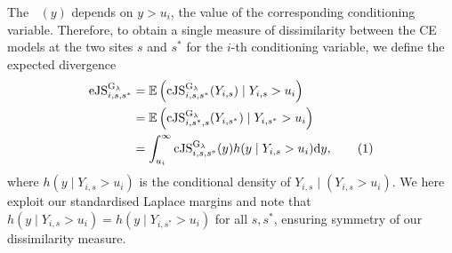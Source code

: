 \documentclass[12pt,compact]{article}
\newcommand{\JSGa}{\mathop{\mathrm{JS}^{\mathrm{G}_{\lambda}}}\nolimits}
\newcommand{\cJSGa}[1]{\mathop{\mathrm{cJS}_{i, #1}^{\mathrm{G}_{\lambda}}}\nolimits}
\newcommand{\eJSGa}[1]{\mathop{\mathrm{eJS}_{i, #1}^{\mathrm{G}_{\lambda}}}\nolimits}
\newcommand\numberthis{\addtocounter{equation}{1}\tag{\theequation}}
\begin{document}
The $\cJSGa{s, s^*}(y)$ depends on $y > u_i$, the value of the corresponding conditioning variable. 
Therefore, to obtain a single measure of dissimilarity between the CE models at the two sites $s$ and $s^*$ for the $i$-th conditioning variable, we define the expected divergence
\begin{align*}%
  \eJSGa{s, s^*} &= \mathbb{E}\left(\cJSGa{s, s^*}(Y_{i,s}) \mid Y_{i,s} > u_i\right) \\
                 &= \mathbb{E}\left(\cJSGa{s^*, s}(Y_{i,s^*}) \mid Y_{i,s^*} > u_i\right) \\
                 &= \int_{u_i}^{\infty} \cJSGa{s, s^*}(y) h(y \mid Y_{i,s} > u_i) \mathrm{d}y, \numberthis \label{eq:jsga_integral}
\end{align*}
where $h(y \mid Y_{i, s} > u_i)$ is the conditional density of $Y_{i, s} \mid (Y_{i, s} > u_i)$.
We here exploit our standardised Laplace margins and note that $h(y \mid Y_{i, s} > u_i) = h(y \mid Y_{i, s^*} > u_i)$ for all $s, s^*$, ensuring symmetry of our dissimilarity measure.
\end{document}
